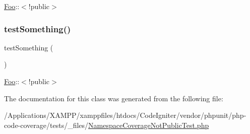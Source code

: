 \mbox{\hyperlink{class_foo}{Foo}}\+:\+:$<$!public$>$ \mbox{\label{class_namespace_coverage_not_public_test_a0fc4e17369bc9607ebdd850d9eda8167}} 
\subsubsection{\texorpdfstring{test\+Something()}{testSomething()}\hspace{0.1cm}{\footnotesize\ttfamily [2/2]}}
{\footnotesize\ttfamily test\+Something (\begin{DoxyParamCaption}{ }\end{DoxyParamCaption})}

\mbox{\hyperlink{class_foo}{Foo}}\+:\+:$<$!public$>$ 

The documentation for this class was generated from the following file\+:\begin{DoxyCompactItemize}
\item 
/\+Applications/\+X\+A\+M\+P\+P/xamppfiles/htdocs/\+Code\+Igniter/vendor/phpunit/php-\/code-\/coverage/tests/\+\_\+files/\mbox{\hyperlink{php-code-coverage_2tests_2__files_2_namespace_coverage_not_public_test_8php}{Namespace\+Coverage\+Not\+Public\+Test.\+php}}\end{DoxyCompactItemize}
